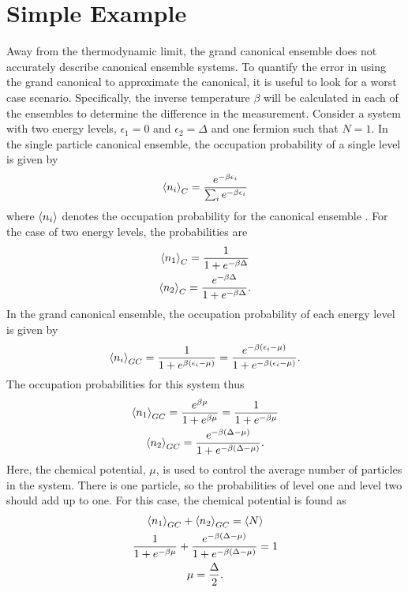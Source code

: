 \section{Simple Example}
Away from the thermodynamic limit, the grand canonical ensemble does not accurately describe canonical ensemble systems. To quantify the error in using the grand canonical to approximate the canonical, it is useful to look for a worst case scenario.
Specifically, the inverse temperature $\beta$ will be calculated in each of the ensembles to determine the difference in the measurement. Consider a system with two energy levels, $\epsilon_1=0$ and $\epsilon_2=\Delta$ and one fermion such that $N=1$. In the single particle canonical ensemble, the occupation probability of a single level is given by
\begin{equation}
    \left<{n_i}\right>_C=\frac{e^{-\beta\epsilon_i}}{\sum_i e^{-\beta\epsilon_i}}
\end{equation}
where $\left<{n_i}\right>$ denotes the occupation probability for the canonical ensemble \cite{Kardar}. 
For the case of two energy levels, the probabilities are 
\begin{gather}
    \left<{n_1}\right>_C=\frac{1}{1+e^{-\beta\Delta}}\\
    \left<{n_2}\right>_C=\frac{e^{-\beta\Delta}}{1+e^{-\beta\Delta}}.
\end{gather}
In the grand canonical ensemble, the occupation probability of each energy level is given by 
\begin{equation}
    \left<{n_i}\right>_{GC}=\frac{1}{1+e^{\beta(\epsilon_i-\mu)}}=\frac{e^{-\beta(\epsilon_i-\mu )}}{1+e^{-\beta(\epsilon_i-\mu)}}. \label{GCoccprobab}
\end{equation}
The occupation probabilities for this system thus 
\begin{gather}
    \left<{n_1}\right>_{GC}=\frac{e^{\beta\mu}}{1+e^{\beta\mu}}=\frac{1}{1+e^{-\beta\mu}}\\
    \left<{n_2}\right>_{GC}=\frac{e^{-\beta(\Delta-\mu)}}{1+ e^{-\beta(\Delta-\mu)}}.
\end{gather}
Here, the chemical potential, $\mu$, is used to control the average number of particles in the system. There is one particle, so the probabilities of level one and level two should add up to one. For this case, the chemical potential is found as 
\begin{gather}
    \left<{n_1}\right>_{GC}+\left<{n_2}\right>_{GC}=\left<{N}\right>\nonumber\\
    \frac{1}{1+e^{-\beta\mu}}+\frac{e^{-\beta(\Delta-\mu)}}{1+e^{-\beta(\Delta-\mu)}}=1\nonumber\\
    \mu=\frac{\Delta}{2}.
\end{gather}
